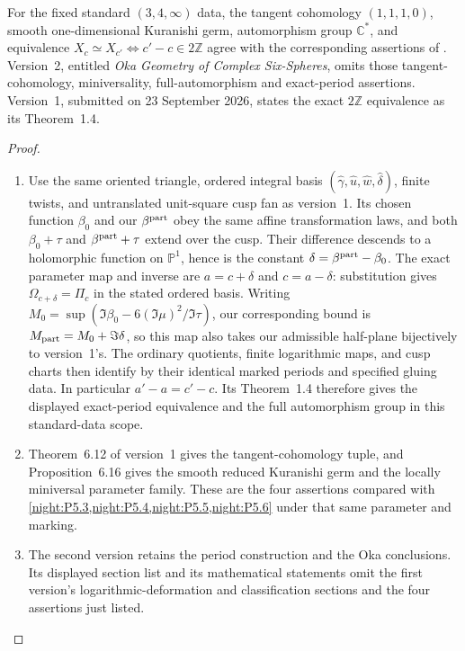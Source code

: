 \begin{remark}\hypertarget{tag-02YS}{}\label{night:P5.7}
For the fixed standard $(3,4,\infty)$ data, the tangent
cohomology $(1,1,1,0)$, smooth one-dimensional Kuranishi germ,
automorphism group $\mathbb C^*$, and equivalence
$X_c\simeq X_{c'}\Longleftrightarrow c'-c\in2\mathbb Z$
agree with the corresponding assertions of
\cite{DuEtAl2026v1}. Version~2, entitled
\emph{Oka Geometry of Complex Six-Spheres}, omits those
tangent-cohomology, miniversality, full-automorphism and exact-period
assertions. Version~1, submitted on
23 September 2026, states the exact $2\mathbb Z$ equivalence as its Theorem~1.4.
\end{remark}
\begin{proof}
\begin{enumerate}[label=\arabic*.]
\item Use the same oriented triangle, ordered integral basis
$(\widehat\gamma,\widehat u,\widehat w,\widehat\delta)$,
finite twists, and untranslated unit-square cusp fan as version~1.
Its chosen function $\beta_0$ and our $\beta^{\rm part}$ obey the
same affine transformation laws, and both $\beta_0+\tau$ and
$\beta^{\rm part}+\tau$ extend over the cusp. Their difference
descends to a holomorphic function on $\mathbb P^1$, hence is the
constant $\delta=\beta^{\rm part}-\beta_0$. The exact parameter
map and inverse are $a=c+\delta$ and $c=a-\delta$: substitution
gives $\Omega_{c+\delta}=\Pi_c$ in the stated ordered basis.
Writing $M_0=\sup(\Im\beta_0-6(\Im\mu)^2/\Im\tau)$,
our corresponding bound is $M_{\rm part}=M_0+\Im\delta$, so this
map also takes our admissible half-plane bijectively to version~1's.
The ordinary quotients, finite logarithmic maps, and cusp charts
then identify by their identical marked periods and specified
gluing data. In particular $a'-a=c'-c$. Its Theorem~1.4 therefore
gives the displayed exact-period equivalence and the full
automorphism group in this standard-data scope.
\item Theorem~6.12 of version~1 gives the tangent-cohomology tuple,
and Proposition~6.16 gives the smooth reduced Kuranishi germ and
the locally miniversal parameter family. These are the
four assertions compared with \cref{night:P5.3,night:P5.4,night:P5.5,night:P5.6}
under that same parameter and marking.
\item The second version retains the period construction and the
Oka conclusions. Its displayed section list and its mathematical
statements omit the first version's logarithmic-deformation and
classification sections and the four assertions just listed.
\end{enumerate}
\end{proof}